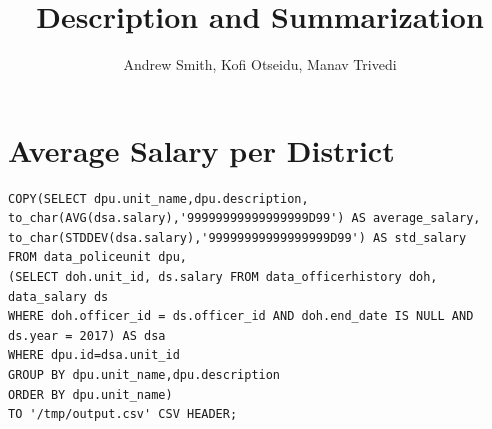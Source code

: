 \documentclass{article}
\title{Description and Summarization}
\author{Andrew Smith, Kofi Otseidu, Manav Trivedi}
\begin{document}
\maketitle

\section{Average Salary per District}

\begin{lstlisting}[frame=single]
COPY(SELECT dpu.unit_name,dpu.description, 
to_char(AVG(dsa.salary),'99999999999999999D99') AS average_salary,
to_char(STDDEV(dsa.salary),'99999999999999999D99') AS std_salary
FROM data_policeunit dpu, 
(SELECT doh.unit_id, ds.salary FROM data_officerhistory doh, data_salary ds 
WHERE doh.officer_id = ds.officer_id AND doh.end_date IS NULL AND ds.year = 2017) AS dsa
WHERE dpu.id=dsa.unit_id
GROUP BY dpu.unit_name,dpu.description
ORDER BY dpu.unit_name)
TO '/tmp/output.csv' CSV HEADER;
\end{lstlisting}
\end{document}
